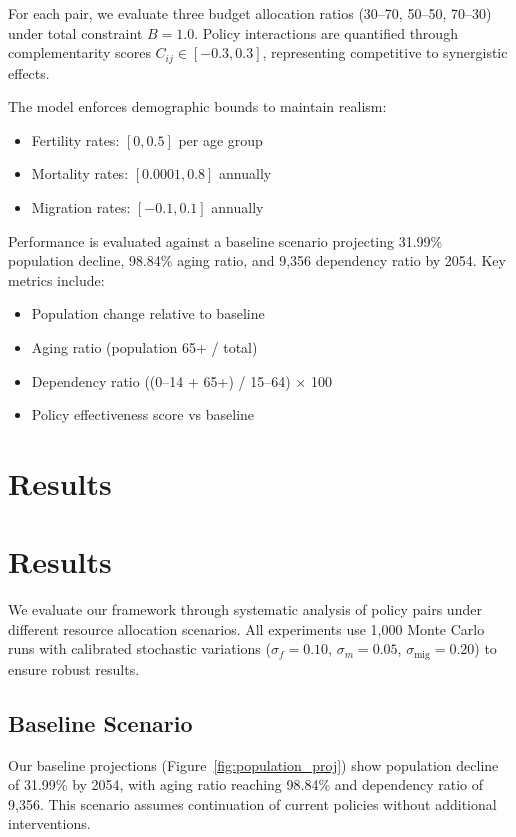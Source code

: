 \documentclass{article} %
\begin{document}
For each pair, we evaluate three budget allocation ratios (30--70, 50--50, 70--30) under total constraint $B = 1.0$. Policy interactions are quantified through complementarity scores $C_{ij} \in [-0.3,0.3]$, representing competitive to synergistic effects.

The model enforces demographic bounds to maintain realism:
\begin{itemize}
    \item Fertility rates: $[0, 0.5]$ per age group
    \item Mortality rates: $[0.0001, 0.8]$ annually
    \item Migration rates: $[-0.1, 0.1]$ annually
\end{itemize}

Performance is evaluated against a baseline scenario projecting 31.99\% population decline, 98.84\% aging ratio, and 9,356 dependency ratio by 2054. Key metrics include:
\begin{itemize}
    \item Population change relative to baseline
    \item Aging ratio (population 65+ / total)
    \item Dependency ratio ((0--14 + 65+) / 15--64) $\times$ 100
    \item Policy effectiveness score vs baseline
\end{itemize}


\section{Results}
\label{sec:results}

\section{Results}
\label{sec:results}

We evaluate our framework through systematic analysis of policy pairs under different resource allocation scenarios. All experiments use 1,000 Monte Carlo runs with calibrated stochastic variations ($\sigma_f = 0.10$, $\sigma_m = 0.05$, $\sigma_{\text{mig}} = 0.20$) to ensure robust results.

\subsection{Baseline Scenario}
Our baseline projections (Figure~\ref{fig:population_proj}) show population decline of 31.99\% by 2054, with aging ratio reaching 98.84\% and dependency ratio of 9,356. This scenario assumes continuation of current policies without additional interventions.
\end{document}

